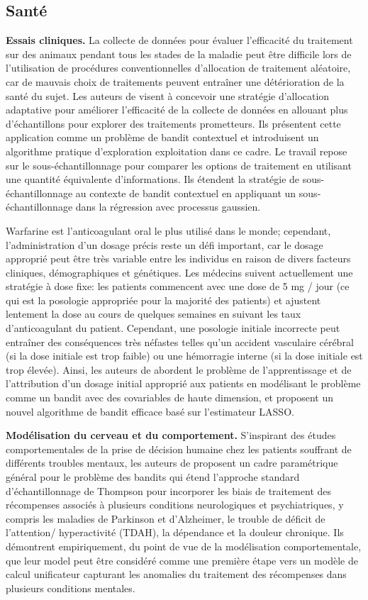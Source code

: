 \documentclass[conference]{IEEEtran}
\newcommand{\1}[1]{\mathbbm{1}_{\left\{#1\right\}}}
\begin{document}
\subsection{Santé}
\textbf {Essais cliniques. } La collecte de données pour évaluer l'efficacité du traitement sur des animaux pendant tous les stades de la maladie peut être difficile lors de l'utilisation de procédures conventionnelles d'allocation de traitement aléatoire, car de mauvais choix de traitements peuvent entraîner une détérioration de la santé du sujet. Les auteurs de \cite{durand2018contextual} visent à concevoir une stratégie d'allocation adaptative pour améliorer l'efficacité de la collecte de données en allouant plus d'échantillons pour explorer des traitements prometteurs. Ils présentent cette application comme un problème de bandit contextuel et introduisent un algorithme pratique d'exploration exploitation dans ce cadre. Le travail repose sur le sous-échantillonnage pour comparer les options de traitement en utilisant une quantité équivalente d'informations. Ils étendent la stratégie de sous-échantillonnage au contexte de bandit contextuel en appliquant un sous-échantillonnage dans la régression avec processus gaussien. 

Warfarine est l'anticoagulant oral le plus utilisé dans le monde; cependant, l'administration d'un dosage précis reste un défi important, car le dosage approprié peut être très variable entre les individus en raison de divers facteurs cliniques, démographiques et génétiques. Les médecins suivent actuellement une stratégie à dose fixe: les patients commencent avec une dose de 5 mg / jour (ce qui est la posologie appropriée pour la majorité des patients) et ajustent lentement la dose au cours de quelques semaines en suivant les taux d’anticoagulant du patient. Cependant, une posologie initiale incorrecte peut entraîner des conséquences très néfastes telles qu'un accident vasculaire cérébral (si la dose initiale est trop faible) ou une hémorragie interne (si la dose initiale est trop élevée). Ainsi, les auteurs de \cite{bastani2015online} abordent le problème de l'apprentissage et de l'attribution d'un dosage initial approprié aux patients en modélisant le problème comme un bandit avec des covariables de haute dimension, et proposent un nouvel algorithme de bandit efficace basé sur l'estimateur LASSO.

\textbf{Modélisation du cerveau et du comportement.} S'inspirant des études comportementales de la prise de décision humaine chez les patients souffrant de différents troubles mentaux, les auteurs de \cite{bouneffouf2017bandit} proposent un cadre paramétrique général pour le problème des bandits qui étend l'approche standard d'échantillonnage de Thompson pour incorporer les biais de traitement des récompenses associés à plusieurs conditions neurologiques et psychiatriques, y compris les maladies de Parkinson et d'Alzheimer, le trouble de déficit de l'attention/ hyperactivité (TDAH), la dépendance et la douleur chronique. Ils démontrent empiriquement, du point de vue de la modélisation comportementale, que leur model peut être considéré comme une première étape vers un modèle de calcul unificateur capturant les anomalies du traitement des récompenses dans plusieurs conditions mentales. 
\end{document}
